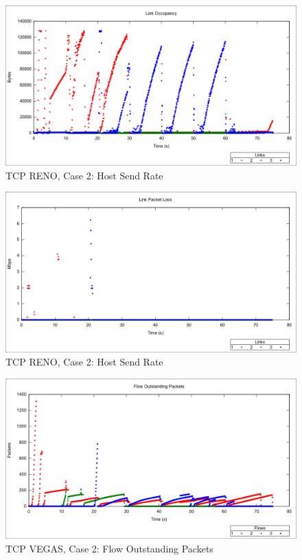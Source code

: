 \begin{figure}[htbp]
    \centering
    \includegraphics[width=\textwidth]{reno2/Link_Occupancy.png}
    \caption{TCP RENO, Case 2: Host Send Rate}
\end{figure}

\begin{figure}[htbp]
    \centering
    \includegraphics[width=\textwidth]{reno2/Link_Packet_Loss.png}
    \caption{TCP RENO, Case 2: Host Send Rate}
\end{figure}


\newpage
\clearpage


\begin{figure}[htbp]
    \centering
    \includegraphics[width=\textwidth]{vegas2/Flow_Outstanding_Packets.png}
    \caption{TCP VEGAS, Case 2: Flow Outstanding Packets}
\end{figure}


